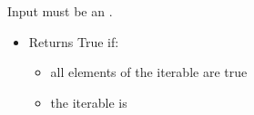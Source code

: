 Input must be an .
\begin{itemize}
  \item Returns True if:
    \begin{itemize}
      \item all elements of the iterable are true
      \item the iterable is {}
    \end{itemize}
\end{itemize}
